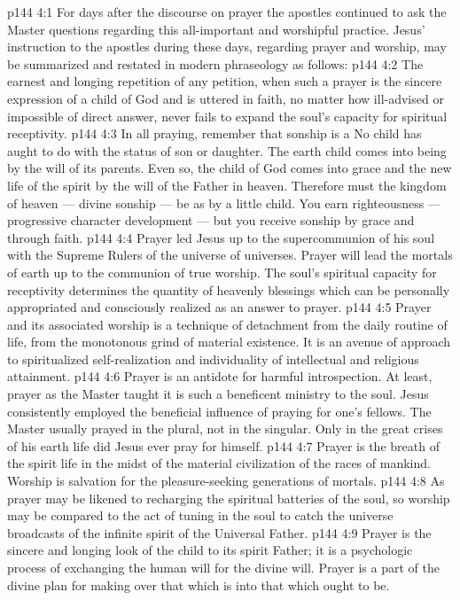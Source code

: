 \vs p144 4:1 For days after the discourse on prayer the apostles continued to ask the Master questions regarding this all\hyp{}important and worshipful practice. Jesus’ instruction to the apostles during these days, regarding prayer and worship, may be summarized and restated in modern phraseology as follows:
\vs p144 4:2 \pc The earnest and longing repetition of any petition, when such a prayer is the sincere expression of a child of God and is uttered in faith, no matter how ill\hyp{}advised or impossible of direct answer, never fails to expand the soul’s capacity for spiritual receptivity.
\vs p144 4:3 In all praying, remember that sonship is a  No child has aught to do with  the status of son or daughter. The earth child comes into being by the will of its parents. Even so, the child of God comes into grace and the new life of the spirit by the will of the Father in heaven. Therefore must the kingdom of heaven --- divine sonship --- be  as by a little child. You earn righteousness --- progressive character development --- but you receive sonship by grace and through faith.
\vs p144 4:4 Prayer led Jesus up to the supercommunion of his soul with the Supreme Rulers of the universe of universes. Prayer will lead the mortals of earth up to the communion of true worship. The soul’s spiritual capacity for receptivity determines the quantity of heavenly blessings which can be personally appropriated and consciously realized as an answer to prayer.
\vs p144 4:5 Prayer and its associated worship is a technique of detachment from the daily routine of life, from the monotonous grind of material existence. It is an avenue of approach to spiritualized self\hyp{}realization and individuality of intellectual and religious attainment.
\vs p144 4:6 Prayer is an antidote for harmful introspection. At least, prayer as the Master taught it is such a beneficent ministry to the soul. Jesus consistently employed the beneficial influence of praying for one’s fellows. The Master usually prayed in the plural, not in the singular. Only in the great crises of his earth life did Jesus ever pray for himself.
\vs p144 4:7 Prayer is the breath of the spirit life in the midst of the material civilization of the races of mankind. Worship is salvation for the pleasure\hyp{}seeking generations of mortals.
\vs p144 4:8 As prayer may be likened to recharging the spiritual batteries of the soul, so worship may be compared to the act of tuning in the soul to catch the universe broadcasts of the infinite spirit of the Universal Father.
\vs p144 4:9 Prayer is the sincere and longing look of the child to its spirit Father; it is a psychologic process of exchanging the human will for the divine will. Prayer is a part of the divine plan for making over that which is into that which ought to be.
